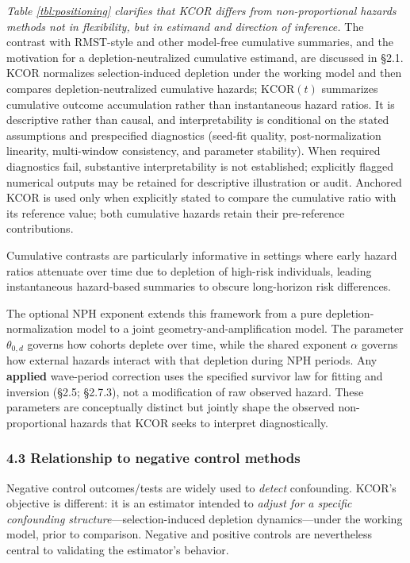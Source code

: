 \documentclass[
]{article}
\begin{document}
\emph{Table \ref{tbl:positioning} clarifies that KCOR differs from non-proportional hazards methods not in flexibility, but in estimand and direction of inference.} The contrast with RMST-style and other model-free cumulative summaries, and the motivation for a depletion-neutralized cumulative estimand, are discussed in §2.1. KCOR normalizes selection-induced depletion under the working model and then compares depletion-neutralized cumulative hazards; \(\mathrm{KCOR}(t)\) summarizes cumulative outcome accumulation rather than instantaneous hazard ratios. It is descriptive rather than causal, and interpretability is conditional on the stated assumptions and prespecified diagnostics (seed-fit quality, post-normalization linearity, multi-window consistency, and parameter stability). When required diagnostics fail, substantive interpretability is not established; explicitly flagged numerical outputs may be retained for descriptive illustration or audit. Anchored KCOR is used only when explicitly stated to compare the cumulative ratio with its reference value; both cumulative hazards retain their pre-reference contributions.

Cumulative contrasts are particularly informative in settings where early hazard ratios attenuate over time due to depletion of high-risk individuals, leading instantaneous hazard-based summaries to obscure long-horizon risk differences.

The optional NPH exponent extends this framework from a pure depletion-normalization model to a joint geometry-and-amplification model. The parameter \(\theta_{0,d}\) governs how cohorts deplete over time, while the shared exponent \(\alpha\) governs how external hazards interact with that depletion during NPH periods. Any \textbf{applied} wave-period correction uses the specified survivor law for fitting and inversion (§2.5; §2.7.3), not a modification of raw observed hazard. These parameters are conceptually distinct but jointly shape the observed non-proportional hazards that KCOR seeks to interpret diagnostically.

\subsubsection{4.3 Relationship to negative control methods}\label{relationship-to-negative-control-methods}

Negative control outcomes/tests are widely used to \emph{detect} confounding. KCOR's objective is different: it is an estimator intended to \emph{adjust for a specific confounding structure}---selection-induced depletion dynamics---under the working model, prior to comparison. Negative and positive controls are nevertheless central to validating the estimator's behavior.
\end{document}
